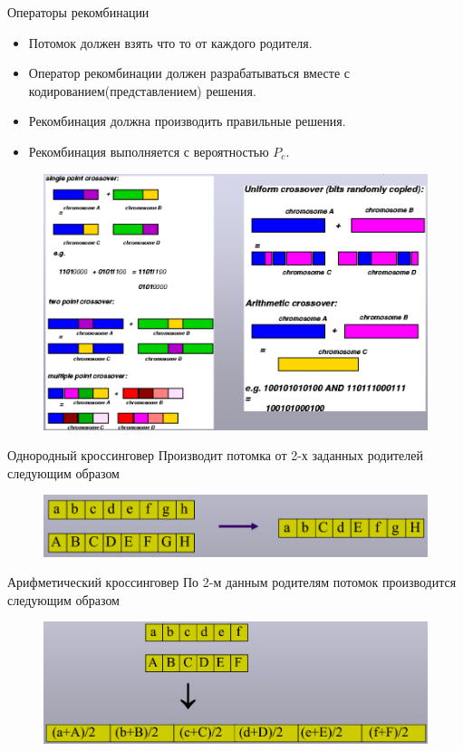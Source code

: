 \documentclass{beamer}
\begin{document}
\begin{frame}{Операторы рекомбинации}
\begin{itemize}
\item Потомок должен взять что то от каждого родителя.
\item Оператор рекомбинации должен разрабатываться вместе с кодированием(представлением) решения.
\item Рекомбинация должна производить правильные решения.
\item Рекомбинация выполняется с вероятностью $P_c$.
\end{itemize}
\end{frame}

\begin{frame}
\begin{figure}[h]
\centering
\includegraphics[scale=0.4]{images/lec04-pic32.png}
\end{figure}
\end{frame}

\begin{frame}{Однородный кроссинговер}
Производит потомка от 2-х заданных родителей следующим образом
\begin{figure}[h]
\centering
\includegraphics[scale=0.4]{images/lec04-pic33.png}
\end{figure}
\end{frame}

\begin{frame}{Арифметический кроссинговер}
По 2-м данным родителям потомок производится следующим образом
\begin{figure}[h]
\centering
\includegraphics[scale=0.4]{images/lec04-pic34.png}
\end{figure}
\end{frame}
\end{document}
